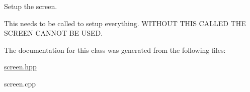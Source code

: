 Setup the screen. 

This needs to be called to setup everything. W\+I\+T\+H\+O\+UT T\+H\+IS C\+A\+L\+L\+ED T\+HE S\+C\+R\+E\+EN C\+A\+N\+N\+OT BE U\+S\+ED. 

The documentation for this class was generated from the following files\+:\begin{DoxyCompactItemize}
\item 
\hyperlink{screen_8hpp}{screen.\+hpp}\item 
screen.\+cpp\end{DoxyCompactItemize}

